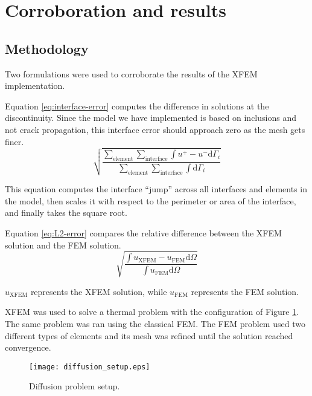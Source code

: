 \section{Corroboration and results}
\label{corroboration_results}


\subsection{Methodology}

Two formulations were used to corroborate the results of the XFEM implementation.

Equation \ref{eq:interface-error} computes the difference in solutions at the discontinuity. Since the model we have implemented is based on inclusions and not crack propagation, this interface error should approach zero as the mesh gets finer.
%
\begin{equation}
	\sqrt{\frac{\sum_{\mathrm{element}} \sum_{\mathrm{interface}} \int u^+-u^- \mathrm{d}\Gamma_i}{\sum_{\mathrm{element}} \sum_{\mathrm{interface}} \int \mathrm{d}\Gamma_i}}
	\label{eq:interface-error}
\end{equation}

This equation computes the interface ``jump'' across all interfaces and elements in the model, then scales it with respect to the perimeter or area of the interface, and finally takes the square root.

Equation \ref{eq:L2-error} compares the relative difference between the XFEM solution and the FEM solution.
%
\begin{equation}
	\sqrt{\frac{\int u_{\mathrm{XFEM}}-u_{\mathrm{FEM}} \mathrm{d}\Omega}{\int u_{\mathrm{FEM}} \mathrm{d}\Omega}}
	\label{eq:L2-error}
\end{equation}

$u_{\mathrm{XFEM}}$ represents the XFEM solution, while $u_{\mathrm{FEM}}$ represents the FEM solution.

XFEM was used to solve a thermal problem with the configuration of Figure \ref{fig:thermal-setup}. The same problem was ran using the classical FEM. The FEM problem used two different types of elements and its mesh was refined until the solution reached convergence.
%
\begin{figure}[htbp]
	\centering
	\texttt{[image: diffusion\_setup.eps]}
	\caption[Diffusion problem setup]{Diffusion problem setup.}
	\label{fig:thermal-setup}
\end{figure}

